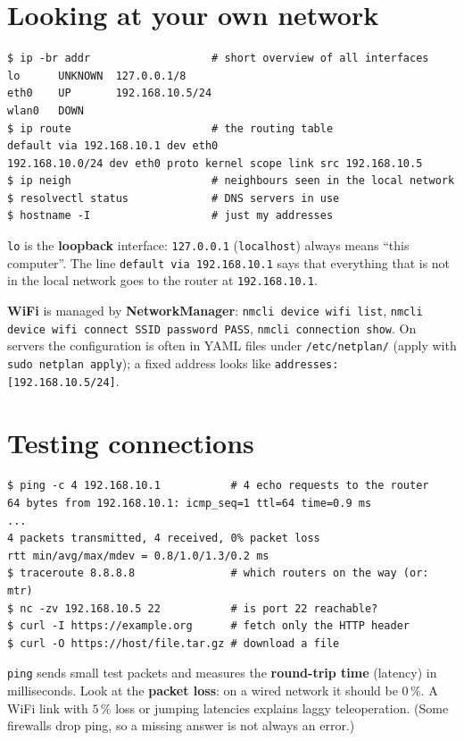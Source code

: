 \section*{Looking at your own network}
\begin{verbatim}
$ ip -br addr                   # short overview of all interfaces
lo      UNKNOWN  127.0.0.1/8
eth0    UP       192.168.10.5/24
wlan0   DOWN
$ ip route                      # the routing table
default via 192.168.10.1 dev eth0
192.168.10.0/24 dev eth0 proto kernel scope link src 192.168.10.5
$ ip neigh                      # neighbours seen in the local network
$ resolvectl status             # DNS servers in use
$ hostname -I                   # just my addresses
\end{verbatim}
\texttt{lo} is the \textbf{loopback} interface: \texttt{127.0.0.1} (\texttt{localhost}) always means ``this computer''. The line \texttt{default via 192.168.10.1} says that everything that is not in the local network goes to the router at \texttt{192.168.10.1}.

\textbf{WiFi} is managed by \textbf{NetworkManager}: \verb|nmcli device wifi list|, \verb|nmcli device wifi connect SSID password PASS|, \verb|nmcli connection show|. On servers the configuration is often in YAML files under \texttt{/etc/netplan/} (apply with \verb|sudo netplan apply|); a fixed address looks like \texttt{addresses: [192.168.10.5/24]}.

\section*{Testing connections}
\begin{verbatim}
$ ping -c 4 192.168.10.1           # 4 echo requests to the router
64 bytes from 192.168.10.1: icmp_seq=1 ttl=64 time=0.9 ms
...
4 packets transmitted, 4 received, 0% packet loss
rtt min/avg/max/mdev = 0.8/1.0/1.3/0.2 ms
$ traceroute 8.8.8.8               # which routers on the way (or: mtr)
$ nc -zv 192.168.10.5 22           # is port 22 reachable?
$ curl -I https://example.org      # fetch only the HTTP header
$ curl -O https://host/file.tar.gz # download a file
\end{verbatim}
\texttt{ping} sends small test packets and measures the \textbf{round-trip time} (latency) in milliseconds. Look at the \textbf{packet loss}: on a wired network it should be $0\,\%$. A WiFi link with $5\,\%$ loss or jumping latencies explains laggy teleoperation. (Some firewalls drop ping, so a missing answer is not always an error.)

